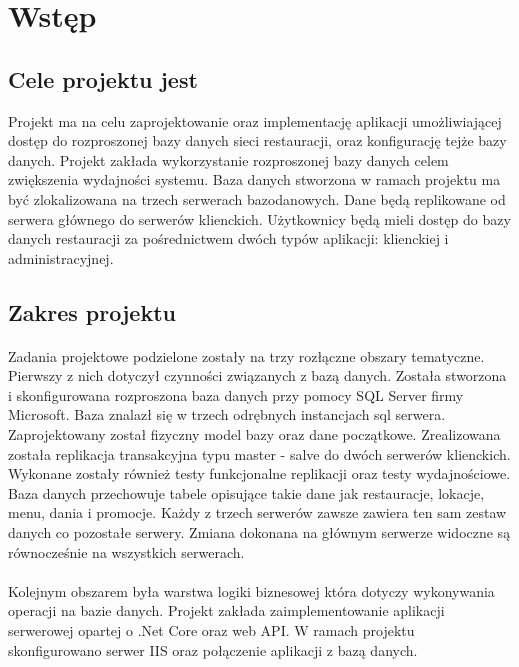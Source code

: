 \documentclass{article}
\begin{document}
\tableofcontents
 \newpage
\section{Wstęp}
	\subsection{Cele projektu jest}
	Projekt ma na celu zaprojektowanie oraz implementację aplikacji umożliwiającej dostęp do rozproszonej bazy danych sieci restauracji, oraz konfigurację tejże bazy danych. Projekt zakłada wykorzystanie rozproszonej bazy danych celem zwiększenia wydajności systemu. Baza danych stworzona w ramach projektu ma być zlokalizowana na trzech serwerach bazodanowych. Dane będą replikowane od serwera głównego do serwerów klienckich. Użytkownicy będą mieli dostęp do bazy danych restauracji za pośrednictwem dwóch typów aplikacji: klienckiej i administracyjnej.
	
	\subsection{Zakres projektu}
	\paragraph{}
	Zadania projektowe podzielone zostały na trzy rozłączne obszary tematyczne. Pierwszy z nich dotyczył czynności związanych z bazą danych. Została stworzona i skonfigurowana rozproszona baza danych przy pomocy SQL Server firmy Microsoft. Baza znalazł się w trzech odrębnych instancjach sql serwera. Zaprojektowany został fizyczny model bazy oraz dane początkowe. Zrealizowana została replikacja transakcyjna typu master - salve do dwóch serwerów klienckich. Wykonane zostały również testy funkcjonalne replikacji oraz testy wydajnościowe. Baza danych przechowuje tabele opisujące takie dane jak restauracje, lokacje, menu, dania i promocje. Każdy z trzech serwerów zawsze zawiera ten sam zestaw danych co pozostałe serwery. Zmiana dokonana na głównym serwerze widoczne są równocześnie na wszystkich serwerach.
	\paragraph{}
	Kolejnym obszarem była warstwa logiki biznesowej która dotyczy wykonywania operacji na bazie danych. Projekt zakłada zaimplementowanie aplikacji serwerowej opartej o .Net Core oraz web API.  W ramach projektu skonfigurowano serwer IIS oraz połączenie aplikacji z bazą danych. 
\end{document}

